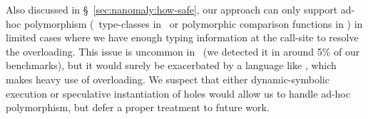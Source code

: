 Also discussed in \S~\ref{sec:nanomaly:how-safe}, our approach can only support
ad-hoc polymorphism (\eg\ type-classes in \haskell\ or polymorphic
comparison functions in \ocaml) in limited cases where we have enough
typing information at the call-site to resolve the overloading. This
issue is uncommon in \ocaml\ (we detected it in around 5\% of our
benchmarks), but it would surely be exacerbated by a language like
\haskell, which makes heavy use of overloading. We suspect that either
dynamic-symbolic execution or speculative instantiation of holes would
allow us to handle ad-hoc polymorphism, but defer a proper treatment to
future work.


